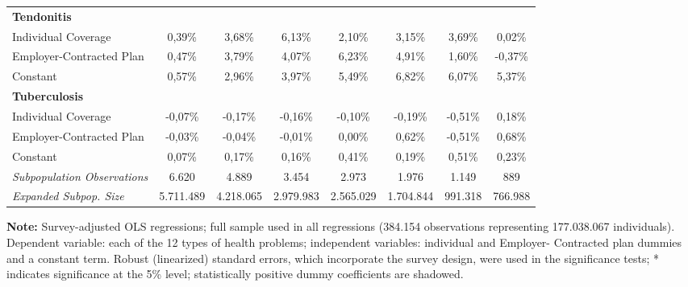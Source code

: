 \documentclass{article}
\begin{document}
\begin{table*}
{\begin{tabular}{l*{7}{c}}
\midrule
\textbf{Tendonitis} & & & & & & & \\

Individual Coverage &   0,39\%  &     \cellcolor[gray]{0.9}   3,68\%\sym{*}  &   \cellcolor[gray]{0.9}     6,13\%\sym{***}&   2,10\%  &   3,15\%  &   3,69\%  &   0,02\% \\
Employer-Contracted Plan&   0,47\%  &   \cellcolor[gray]{0.9}     3,79\%\sym{***}&   \cellcolor[gray]{0.9}     4,07\%\sym{***}&    \cellcolor[gray]{0.9}    6,23\%\sym{***}&  \cellcolor[gray]{0.9} 4,91\%\sym{***}&   1,60\%  &  -0,37\% \\
Constant            &   0,57\%\sym{***}&   2,96\%\sym{***}&   3,97\%\sym{***}&   5,49\%\sym{***}&   6,82\%\sym{***}&   6,07\%\sym{***}&   5,37\%\sym{***}\\

\midrule
\textbf{Tuberculosis} & & & & & & & \\

Individual Coverage &  -0,07\%  &  -0,17\%\sym{*}  &  -0,16\%  &  -0,10\%  &  -0,19\%  &  -0,51\%  &   0,18\% \\
Employer-Contracted Plan&  -0,03\%  &  -0,04\%  &  -0,01\%  &   0,00\%  &   0,62\%  &  -0,51\%  &   0,68\% \\
Constant            &   0,07\%  &   0,17\%\sym{*}  &   0,16\%  &   0,41\%\sym{**} &   0,19\%  &   0,51\%  &   0,23\% \\

\midrule

\textit{Subpopulation Observations} 	&    6.620 & 4.889 & 3.454 & 2.973 & 1.976 & 1.149 & 889         \\
\textit{Expanded Subpop. Size} 		&   5.711.489 &  4.218.065 &  2.979.983 &  2.565.029 &  1.704.844  &   991.318   &  766.988          \\

	\hline \hline

\end{tabular}}
\justify \small {} \textbf{Note:} Survey-adjusted OLS regressions; full sample used in all regressions (384.154 observations representing 177.038.067
individuals). Dependent variable: each of the 12 types of health problems; independent variables: individual and Employer-
Contracted plan dummies and a constant term. Robust (linearized) standard errors, which incorporate the survey design, were
used in the significance tests; * indicates significance at the 5\% level; statistically positive dummy coefficients are shadowed.
\end{table*}
\end{document}
